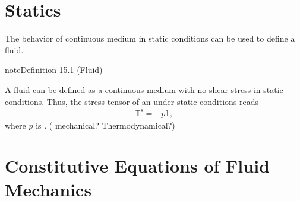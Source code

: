\documentclass[letterpaper,10pt,english]{jupyterBook}
\begin{document}
\chapter{Statics}
\label{\detokenize{ch/fluids/statics:statics}}\label{\detokenize{ch/fluids/statics:fluid-mechanics-statics}}\label{\detokenize{ch/fluids/statics::doc}}
\sphinxAtStartPar
The behavior of continuous medium in static conditions can be used to define a fluid.
\label{ch/fluids/statics:definition-0}
\begin{sphinxadmonition}{note}{Definition 15.1 (Fluid)}



\sphinxAtStartPar
A fluid can be defined as a continuous medium with no shear stress in static conditions. Thus, the stress tensor of an  under static conditions reads
\begin{equation*}
\begin{split}\mathbb{T}^s = - p \mathbb{I} \ ,\end{split}
\end{equation*}
\sphinxAtStartPar
where \(p\) is . ( mechanical? Thermodynamical?)
\end{sphinxadmonition}

\sphinxstepscope


\chapter{Constitutive Equations of Fluid Mechanics}
\label{\detokenize{ch/fluids/constitutive-equations:constitutive-equations-of-fluid-mechanics}}\label{\detokenize{ch/fluids/constitutive-equations:fluid-mechanics-constutive-equations}}\label{\detokenize{ch/fluids/constitutive-equations::doc}}
\end{document}
